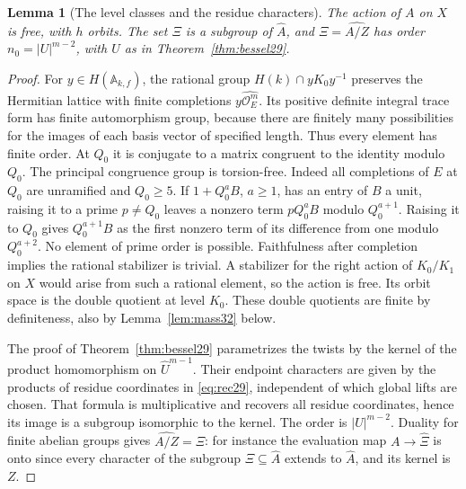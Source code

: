\documentclass[a4paper,11pt]{article}
\newtheorem{lemma}[proposition]{Lemma}
\theoremstyle{definition}
\theoremstyle{remark}
\numberwithin{equation}{section}
\newcommand{\OO}{\mathcal O}
\begin{document}
\begin{lemma}[The level classes and the residue characters]\label{lem:free32}
The action of \(A\) on \(X\) is free, with \(h\) orbits. The set \(\Xi\) is a subgroup of \(\widehat A\), and \(\Xi=\widehat{A/Z}\) has order \(n_0=|U|^{m-2}\), with \(U\) as in Theorem~\ref{thm:bessel29}.
\end{lemma}
\begin{proof}
For \(y\in H(\mathbb A_{k,f})\), the rational group \(H(k)\cap yK_0 y^{-1}\) preserves the Hermitian lattice with finite completions \(y\widehat{\OO_E^m}\). Its positive definite integral trace form has finite automorphism group, because there are finitely many possibilities for the images of each basis vector of specified length. Thus every element has finite order. At \(Q_0\) it is conjugate to a matrix congruent to the identity modulo \(Q_0\). The principal congruence group is torsion-free. Indeed all completions of \(E\) at \(Q_0\) are unramified and \(Q_0\ge5\). If \(1+Q_0^aB\), \(a\ge1\), has an entry of \(B\) a unit, raising it to a prime \(p\ne Q_0\) leaves a nonzero term \(pQ_0^a B\) modulo \(Q_0^{a+1}\). Raising it to \(Q_0\) gives \(Q_0^{a+1}B\) as the first nonzero term of its difference from one modulo \(Q_0^{a+2}\). No element of prime order is possible. Faithfulness after completion implies the rational stabilizer is trivial. A stabilizer for the right action of \(K_0/K_1\) on \(X\) would arise from such a rational element, so the action is free. Its orbit space is the double quotient at level \(K_0\). These double quotients are finite by definiteness, also by Lemma~\ref{lem:mass32} below.

The proof of Theorem~\ref{thm:bessel29} parametrizes the twists by the kernel of the product homomorphism on \(\widehat U^{m-1}\). Their endpoint characters are given by the products of residue coordinates in \eqref{eq:rec29}, independent of which global lifts are chosen. That formula is multiplicative and recovers all residue coordinates, hence its image is a subgroup isomorphic to the kernel. The order is \(|U|^{m-2}\). Duality for finite abelian groups gives \(\widehat{A/Z}=\Xi\): for instance the evaluation map \(A\to\widehat\Xi\) is onto since every character of the subgroup \(\Xi\subseteq\widehat A\) extends to \(\widehat A\), and its kernel is \(Z\).
\end{proof}
\end{document}
